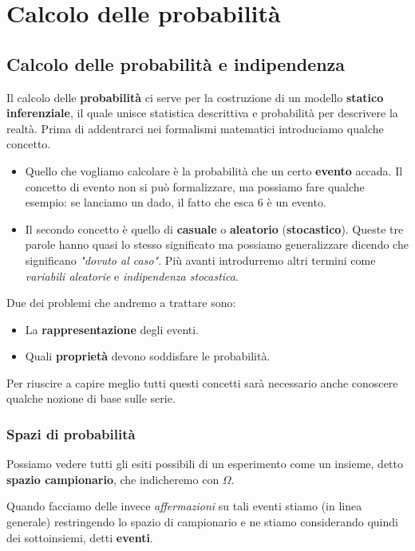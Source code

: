 \part{Calcolo delle probabilità}

\chapter{Calcolo delle probabilità e indipendenza}
Il calcolo delle \textbf{probabilità} ci serve per la costruzione di un modello
\textbf{statico inferenziale}, il quale unisce statistica descrittiva e probabilità per descrivere
la realtà. Prima di addentrarci nei formalismi matematici introduciamo qualche concetto.
\begin{itemize}
	\item Quello che vogliamo calcolare è la probabilità che un certo \textbf{evento} accada. Il
	      concetto
	      di evento non si può formalizzare, ma possiamo fare qualche esempio: se lanciamo un dado,
	      il fatto che esca 6 è un evento.
	\item Il secondo concetto è quello di \textbf{casuale} o \textbf{aleatorio}
	      (\textbf{stocastico}). Queste tre parole hanno quasi lo stesso significato ma possiamo
	      generalizzare dicendo che significano \emph{"dovuto al caso"}. Più avanti introdurremo
	      altri termini come \emph{variabili aleatorie} e \emph{indipendenza stocastica}.
\end{itemize}
Due dei problemi che andremo a trattare sono:
\begin{itemize}
	\item La \textbf{rappresentazione} degli eventi.
	\item Quali \textbf{proprietà} devono soddisfare le probabilità.
\end{itemize}
Per riuscire a capire meglio tutti questi concetti sarà necessario anche conoscere qualche nozione
di base sulle serie.

\section{Spazi di probabilità}
Possiamo vedere tutti gli esiti possibili di un esperimento come un insieme, detto
\textbf{spazio campionario}, che indicheremo con $\Omega$.

Quando facciamo delle invece \emph{affermazioni} su tali eventi stiamo (in linea generale)
restringendo lo spazio di campionario e ne stiamo considerando quindi dei sottoinsiemi, detti
\textbf{eventi}.

